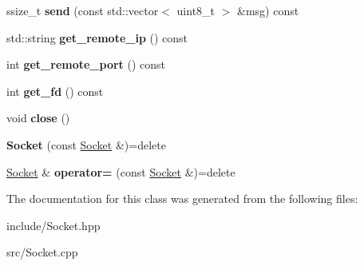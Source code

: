 \begin{DoxyCompactItemize}
\item 
ssize\+\_\+t {\bfseries send} (const std\+::vector$<$ uint8\+\_\+t $>$ \&msg) const \hypertarget{classSocket_a9170626275747d237ec41e34bc06adde}{}\label{classSocket_a9170626275747d237ec41e34bc06adde}

\item 
std\+::string {\bfseries get\+\_\+remote\+\_\+ip} () const \hypertarget{classSocket_ac306c4319e44c66f06629d514f14fae0}{}\label{classSocket_ac306c4319e44c66f06629d514f14fae0}

\item 
int {\bfseries get\+\_\+remote\+\_\+port} () const \hypertarget{classSocket_a7ceb505f14a64370adad549d03618685}{}\label{classSocket_a7ceb505f14a64370adad549d03618685}

\item 
int {\bfseries get\+\_\+fd} () const \hypertarget{classSocket_a0b71ac10bfba0a07612b7db0caa4ce6a}{}\label{classSocket_a0b71ac10bfba0a07612b7db0caa4ce6a}

\item 
void {\bfseries close} ()\hypertarget{classSocket_a75ee749264ccbcfc4dfbf5442e55dcb8}{}\label{classSocket_a75ee749264ccbcfc4dfbf5442e55dcb8}

\item 
{\bfseries Socket} (const \hyperlink{classSocket}{Socket} \&)=delete\hypertarget{classSocket_aae1f09b930bb7118172baa0abb15543e}{}\label{classSocket_aae1f09b930bb7118172baa0abb15543e}

\item 
\hyperlink{classSocket}{Socket} \& {\bfseries operator=} (const \hyperlink{classSocket}{Socket} \&)=delete\hypertarget{classSocket_a32353d2225228b1ee4e3abef0f96cca7}{}\label{classSocket_a32353d2225228b1ee4e3abef0f96cca7}

\end{DoxyCompactItemize}


The documentation for this class was generated from the following files\+:\begin{DoxyCompactItemize}
\item 
include/Socket.\+hpp\item 
src/Socket.\+cpp\end{DoxyCompactItemize}
